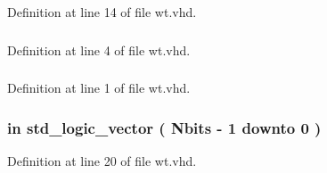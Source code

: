 Definition at line 14 of file wt.\+vhd.

\hypertarget{classwt_aad86249c80e8c1e7ee1c4748aba748e3}{}
\subsubsection[{fixed\+\_\+pkg}]{\hspace{0.3cm}{\ttfamily [Package]}}\label{classwt_aad86249c80e8c1e7ee1c4748aba748e3}


Definition at line 4 of file wt.\+vhd.

\hypertarget{classwt_ae4f03c286607f3181e16b9aa12d0c6d4}{}
\subsubsection[{I\+E\+E\+E}]{\hspace{0.3cm}{\ttfamily [Library]}}\label{classwt_ae4f03c286607f3181e16b9aa12d0c6d4}


Definition at line 1 of file wt.\+vhd.

\hypertarget{classwt_a9e24e3e60e3f24bab11f642255ba1bd4}{}
\subsubsection[{int\+\_\+data}]{ {\bfseries \textcolor{keywordflow}{in}\textcolor{vhdlchar}{ }} {\bfseries \textcolor{comment}{std\+\_\+logic\+\_\+vector}\textcolor{vhdlchar}{ }\textcolor{vhdlchar}{(}\textcolor{vhdlchar}{ }\textcolor{vhdlchar}{ }\textcolor{vhdlchar}{ }\textcolor{vhdlchar}{ }{\bfseries {\bf Nbits}} \textcolor{vhdlchar}{-\/}\textcolor{vhdlchar}{ } \textcolor{vhdldigit}{1} \textcolor{vhdlchar}{ }\textcolor{keywordflow}{downto}\textcolor{vhdlchar}{ }\textcolor{vhdlchar}{ } \textcolor{vhdldigit}{0} \textcolor{vhdlchar}{ }\textcolor{vhdlchar}{)}\textcolor{vhdlchar}{ }} \hspace{0.3cm}{\ttfamily [Port]}}\label{classwt_a9e24e3e60e3f24bab11f642255ba1bd4}


Definition at line 20 of file wt.\+vhd.

\hypertarget{classwt_aee4ab8d7344759fe51ddf58734fd8b17}{}
